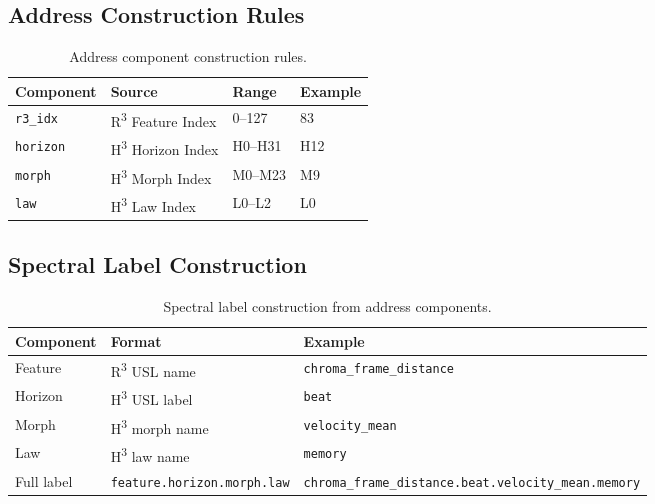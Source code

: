 \subsection{Address Construction Rules}
\label{subsec:address-rules}

\begin{table}[ht]
\centering
\caption{Address component construction rules.}
\label{tab:address-construction}
\begin{tabular}{@{}llll@{}}
\toprule
\textbf{Component} & \textbf{Source} & \textbf{Range} & \textbf{Example} \\
\midrule
\texttt{r3\_idx} & R\textsuperscript{3} Feature Index & 0--127  & 83  \\
\texttt{horizon} & H\textsuperscript{3} Horizon Index  & H0--H31 & H12 \\
\texttt{morph}   & H\textsuperscript{3} Morph Index    & M0--M23 & M9  \\
\texttt{law}     & H\textsuperscript{3} Law Index      & L0--L2  & L0  \\
\bottomrule
\end{tabular}
\end{table}


\subsection{Spectral Label Construction}
\label{subsec:spectral-label}

\begin{table}[ht]
\centering
\caption{Spectral label construction from address components.}
\label{tab:spectral-label}
\begin{tabular}{@{}lll@{}}
\toprule
\textbf{Component} & \textbf{Format} & \textbf{Example} \\
\midrule
Feature    & R\textsuperscript{3} USL name   & \texttt{chroma\_frame\_distance} \\
Horizon    & H\textsuperscript{3} USL label  & \texttt{beat}                   \\
Morph      & H\textsuperscript{3} morph name & \texttt{velocity\_mean}         \\
Law        & H\textsuperscript{3} law name   & \texttt{memory}                 \\
\midrule
Full label & \texttt{feature.horizon.morph.law}
           & \texttt{chroma\_frame\_distance.beat.velocity\_mean.memory} \\
\bottomrule
\end{tabular}
\end{table}


